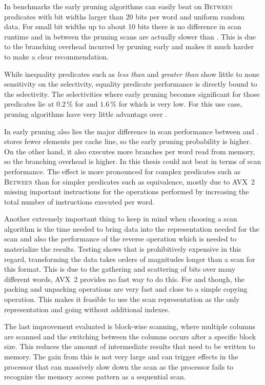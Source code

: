 In benchmarks the early pruning algorithms can easily beat \simdscan{} on
\textsc{Between} predicates with bit widths larger than 20 bits per word and
uniform random data. For small bit widths up to about 10 bits there is no
difference in scan runtime and in between the pruning scans are actually slower
than \simdscan{}. This is due to the branching overhead incurred by pruning
early and makes it much harder to make a clear recommendation.

While inequality predicates such as \emph{less than} and \emph{greater than}
show little to none sensitivity on the selectivity, equality predicate
performance is directly bound to the selectivity. The selectivities where early
pruning becomes significant for those predicates lie at $0.2\,\%$ for \bwv{} and
$1.6\,\%$ for \bs{} which is very low. For this use case, pruning algorithms have
very little advantage over \simdscan{}.

In early pruning also lies the major difference in scan performance between
\bwv{} and \bs{}. \bs{} stores fewer elements per cache line, so the early
pruning probability is higher. On the other hand, it also executes more
branches per word read from memory, so the branching overhead is higher. In this
thesis \bs{} could not beat \bwv{} in terms of scan performance. The effect is
more pronounced for complex predicates such as \textsc{Between} than for
simpler predicates such as equivalence, mostly due to AVX~2 missing important
instructions for the operations performed by \bs{} increasing the total number
of instructions executed per word.

Another extremely important thing to keep in mind when choosing a scan
algorithm is the time needed to bring data into the representation needed for
the scan and also the performance of the reverse operation which is needed to
materialize the results. Testing shows that \bwv{} is prohibitively expensive
in this regard, transforming the data takes orders of magnitudes longer than a
scan for this format. This is due to the gathering and scattering of bits over
many different words, AVX~2 provides no fast way to do this. For \simdscan{}
and \bs{} though, the packing and unpacking operations are very fast and close
to a simple copying operation. This makes it feasible to use the scan
representation as the only representation and going without additional indexes.

The last improvement evaluated is block-wise scanning, where multiple columns
are scanned and the switching between the columns occurs after a specific block
size. This reduces the amount of intermediate results that need to be written
to memory. The gain from this is not very large and can trigger effects in the
processor that can massively slow down the scan as the processor fails to
recognize the memory access pattern as a sequential scan.

